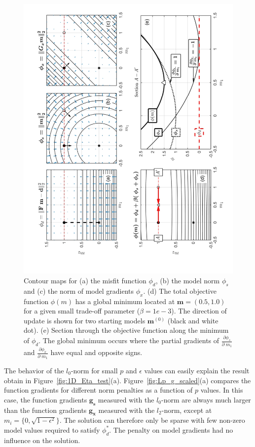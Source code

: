 \begin{figure}[h!]
\centering
\includegraphics[scale=0.55, angle=270]{IRLS_toy_Phis_Phix}
\caption{Contour maps for (a) the misfit function $\phi_d$, (b) the model norm $\phi_s$ and (c) the norm of model gradients $\phi_x$. (d) The total objective function $\phi(m)$ has a global minimum located at $\mathbf{m}=(0.5,1.0)$ for a given small trade-off parameter ($\beta = 1e-3$). The direction of update is shown for two starting models $\mathbf{m}^{(0)}$ (black and white dot). (e) Section through the objective function along the minimum of $\phi_d$. The global minimum occurs where the partial gradients of $\frac{\partial\phi_s}{\partial\;m_1}$ and $\frac{\partial\phi_x}{\partial\;m_1}$ have equal and opposite signs.}
\label{fig:IRLS_Phis_Phix}
\end{figure}

The behavior of the $l_0$-norm for small $p$ and $\epsilon$ values can easily explain the result obtain in Figure~\ref{fig:1D_Eta_test}(a).
Figure~\ref{fig:Lp_g_scaled}(a) compares the function gradients for different norm penalties as a function of $p$ values. 
In this case, the function gradients $\mathbf{g_s}$ measured with the $l_0$-norm are always much larger than the function gradients $\mathbf{g_x}$ measured with the $l_2$-norm, except at $m_i = \{0, \sqrt{1-\epsilon^2}\}$.
The solution can therefore only be sparse with few non-zero model values required to satisfy $\phi_d^*$. 
The penalty on model gradients had no influence on the solution.

